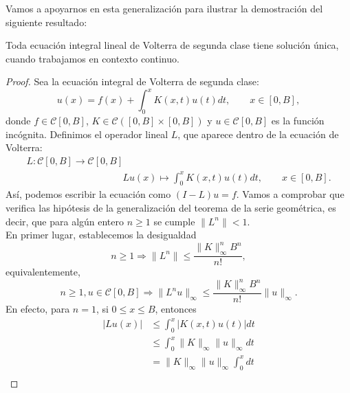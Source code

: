 Vamos a apoyarnos en esta generalización para ilustrar la demostración del siguiente resultado:
\begin{corolario}\label{coroooolario}
	Toda ecuación integral lineal de Volterra de segunda clase tiene solución única, cuando trabajamos en contexto continuo.
\end{corolario}
\begin{proof}
	Sea la ecuación integral de Volterra de segunda clase:
	\begin{equation}
		u(x) = f(x) + \int_0^x K(x,t)u(t)dt, \qquad x \in [0,B],
	\end{equation}
	donde $f \in \mathcal{C}[0,B]$, $K \in \mathcal{C}([0,B]\times [0,B])$ y $u \in \mathcal{C}[0,B]$ es la función incógnita.
	Definimos el operador lineal $L$, que aparece dentro de la ecuación de Volterra:
	\begin{equation}\label{ref_operador}
		\begin{array}{c}
		L: \mathcal{C}[0,B] \rightarrow \mathcal{C}[0,B] \\
		\qquad \qquad \qquad \qquad \qquad Lu(x) \mapsto \displaystyle \int_{0}^{x} K(x,t)u(t)dt, \qquad x \in [0,B].
		\end{array}
	\end{equation}
	Así, podemos escribir la ecuación como $(I-L)u = f$.
	Vamos a comprobar que verifica las hipótesis de la generalización del teorema de la serie geométrica, es decir, que para algún entero $n \geqslant 1$ se cumple $\lVert L^n \rVert < 1$.\\
	En primer lugar, establecemos la desigualdad
	\begin{equation}
		n \geqslant 1 \Rightarrow \lVert L^n \rVert \leqslant \dfrac{\lVert K \rVert_\infty^nB^n}{n!},
	\end{equation}
	equivalentemente,
	\begin{equation}\label{eq:ref}
		n \geqslant 1, u \in \mathcal{C}[0,B] \Rightarrow \lVert L^nu \rVert_\infty \leqslant \dfrac{\lVert K \rVert_\infty^nB^n}{n!}\lVert u \rVert_\infty.
	\end{equation}
	En efecto, para $n = 1$, si $0 \leqslant x \leqslant B$, entonces
	\begin{equation}
		\begin{split}
			\lvert Lu(x) \rvert & \leqslant \int_{0}^{x} |K(x,t)u(t)|dt \\
			& \leqslant \int_{0}^{x} \lVert K \rVert_\infty \lVert u \rVert_\infty dt\\
			& = \lVert K \rVert_\infty \lVert u \rVert_\infty \int_{0}^{x}dt\\

\end{split}
\end{equation}
\end{proof}
